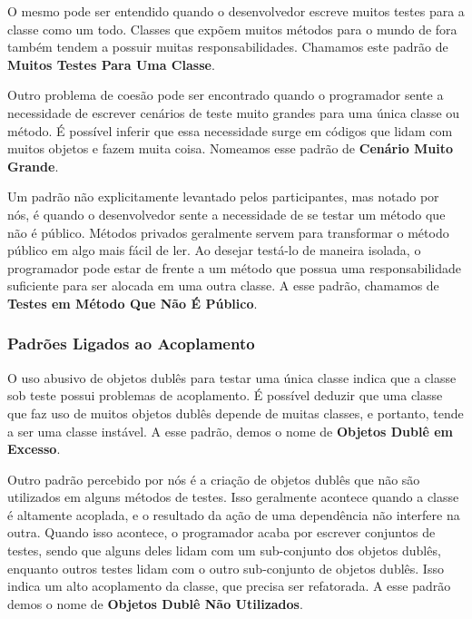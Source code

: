 \documentclass[conference]{IEEEtran}
\begin{document}
O mesmo pode ser entendido quando o desenvolvedor escreve muitos testes para a 
classe como um todo. Classes que expõem muitos métodos para o mundo de fora
também tendem a possuir muitas responsabilidades. Chamamos este padrão
de \textbf{Muitos Testes Para Uma Classe}.

Outro problema de coesão pode ser encontrado quando o programador
sente a necessidade de escrever cenários de teste muito grandes para uma
única classe ou método. É possível inferir que essa necessidade surge 
em códigos que lidam com muitos objetos e fazem muita coisa. Nomeamos
esse padrão de \textbf{Cenário Muito Grande}.

Um padrão não explicitamente levantado pelos participantes, mas notado
por nós, é quando o desenvolvedor sente a necessidade de se testar
um método que não é público. Métodos privados geralmente servem para 
transformar o método público em algo mais fácil de ler. Ao desejar
testá-lo de maneira isolada, o programador pode estar de frente a
um método que possua uma responsabilidade suficiente para ser
alocada em uma outra classe. A esse padrão, chamamos de 
\textbf{Testes em Método Que Não É Público}.

\subsubsection{Padrões Ligados ao Acoplamento}

O uso abusivo de objetos dublês para testar uma
única classe indica que a classe sob teste possui problemas
de acoplamento. É possível deduzir que uma classe que faz uso de muitos
objetos dublês depende de muitas classes, e portanto, tende a ser
uma classe instável. A esse padrão, demos o nome de \textbf{Objetos Dublê em Excesso}.

Outro padrão percebido por nós é a criação de objetos dublês que não
são utilizados em alguns métodos de testes. Isso geralmente acontece quando
a classe é altamente acoplada, e o resultado da ação de uma dependência não
interfere na outra. Quando isso acontece, o programador acaba por escrever
conjuntos de testes, sendo que alguns deles lidam com um sub-conjunto dos objetos dublês,
enquanto outros testes lidam com o outro sub-conjunto de objetos dublês. 
Isso indica um alto acoplamento 
da classe, que precisa ser refatorada. A esse padrão demos o nome de
\textbf{Objetos Dublê Não Utilizados}.

\end{document}
